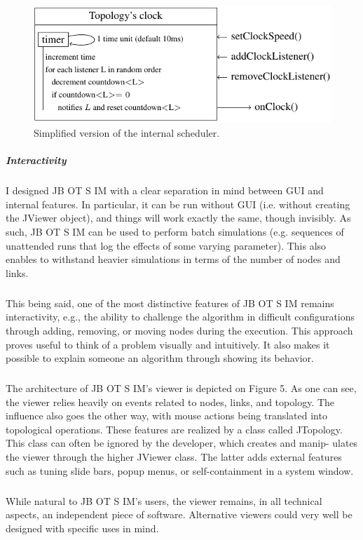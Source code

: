 \begin{figure}[h!]
	\centering
	\includegraphics[width=.7\linewidth]{fig_5}
	\caption[Simplified version of the internal scheduler.]{Simplified version of the internal scheduler.}
	\label{fig:fig5}
\end{figure}
\subparagraph{Interactivity}I designed JB OT S IM with a clear separation in mind between GUI and internal features. In particular, it can be run without GUI (i.e. without creating the JViewer object), and things will work exactly the same, though invisibly. As such, JB OT S IM can be used to perform batch simulations (e.g. sequences of unattended runs that log the effects of some varying parameter). This also enables to withstand heavier simulations in terms of the number of nodes and links.
\subparagraph{}This being said, one of the most distinctive features of JB OT S IM remains interactivity, e.g., the ability to challenge the algorithm in difficult configurations through adding, removing, or moving nodes during the execution. This approach proves useful to think of a problem visually and intuitively. It also makes it possible to explain someone an algorithm through showing its behavior.
\subparagraph{}The architecture of JB OT S IM’s viewer is depicted on Figure 5. As one can see, the viewer relies heavily on events related to nodes, links, and topology. The influence also goes the other way, with mouse actions being translated into topological operations. These features are realized by a class called JTopology. This class can often be ignored by the developer, which creates and manip- ulates the viewer through the higher JViewer class. The latter adds external features such as tuning slide bars, popup menus, or self-containment in a system window. 
\subparagraph{}While natural to JB OT S IM’s users, the viewer remains, in all technical aspects, an independent piece of software. Alternative viewers could very well be designed with specific uses in mind.

